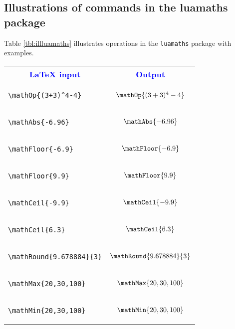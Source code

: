 \documentclass{article}
\begin{document}
\subsection*{Illustrations of commands in the luamaths package}
Table \ref{tbl:illluamaths} illustrates operations in the \verb|luamaths| package with examples.
\begin{center}
\begin{longtable}{lc}
\toprule
\multicolumn{1}{c}{\textcolor{blue}{LaTeX input}} &\multicolumn{1}{c}{\textcolor{blue}{Output}}  \\
\toprule
\begin{lstlisting}
\mathOp{(3+3)^4-4}
\end{lstlisting} & \(\mathOp{(3+3)^4-4}\)\\
\midrule
\begin{lstlisting}
\mathAbs{-6.96}
\end{lstlisting} & \(\mathAbs{-6.96}\)\\
\midrule


\begin{lstlisting}
\mathFloor{-6.9}
\end{lstlisting} & \(\mathFloor{-6.9}\) \\
\midrule

\begin{lstlisting}
\mathFloor{9.9}
\end{lstlisting} & \(\mathFloor{9.9}\)\\
\midrule


\begin{lstlisting}
\mathCeil{-9.9}
\end{lstlisting} &  \(\mathCeil{-9.9}\) \\
\midrule

\begin{lstlisting}
\mathCeil{6.3}
\end{lstlisting} &\(\mathCeil{6.3}\)\\
\midrule

\begin{lstlisting}
\mathRound{9.678884}{3}
\end{lstlisting} & \(\mathRound{9.678884}{3}\)\\
\midrule

\begin{lstlisting}
\mathMax{20,30,100}
\end{lstlisting} &\(\mathMax{20,30,100}\) \\
\midrule

\begin{lstlisting}
\mathMin{20,30,100}
\end{lstlisting} &\(\mathMin{20,30,100}\)\\
\midrule



\end{longtable}
\end{center}
\end{document}
